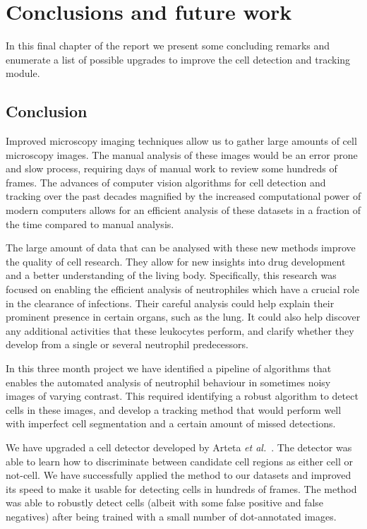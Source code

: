 		
\chapter{Conclusions and future work\statusfirstdraft}
\label{chap:conclusion}

In this final chapter of the report we present some concluding remarks and enumerate a list of possible upgrades to improve the cell detection and tracking module.

\section{Conclusion \statusfirstdraft}
\label{sec:conclusion_conclusion}

Improved microscopy imaging techniques allow us to gather large amounts of cell microscopy images. The manual analysis of these images would be an error prone and slow process, requiring days of manual work to review some hundreds of frames. The advances of computer vision algorithms for cell detection and tracking over the past decades magnified by the increased computational power of modern computers allows for an efficient analysis of these datasets in a fraction of the time compared to manual analysis.

The large amount of data that can be analysed with these new methods improve the quality of cell research. They allow for new insights into drug development and a better understanding of the living body. Specifically, this research was focused on enabling the efficient analysis of neutrophiles which have a crucial role in the clearance of infections. Their careful analysis could help explain their prominent presence in certain organs, such as the lung. It could also help discover any additional activities that these leukocytes perform, and clarify whether they develop from a single or several neutrophil predecessors.

In this three month project we have identified a pipeline of algorithms that enables the automated analysis of neutrophil behaviour in sometimes noisy images of varying contrast. This required identifying a robust algorithm to detect cells in these images, and develop a tracking method that would perform well with imperfect cell segmentation and a certain amount of missed detections.

We have upgraded a cell detector developed by Arteta \emph{et al.}~\cite{arteta12}. The detector was able to learn how to discriminate between candidate cell regions as either cell or not-cell. We have successfully applied the method to our datasets and improved its speed to make it usable for detecting cells in hundreds of frames. The method was able to robustly detect cells (albeit with some false positive and false negatives) after being trained with a small number of dot-annotated images.

